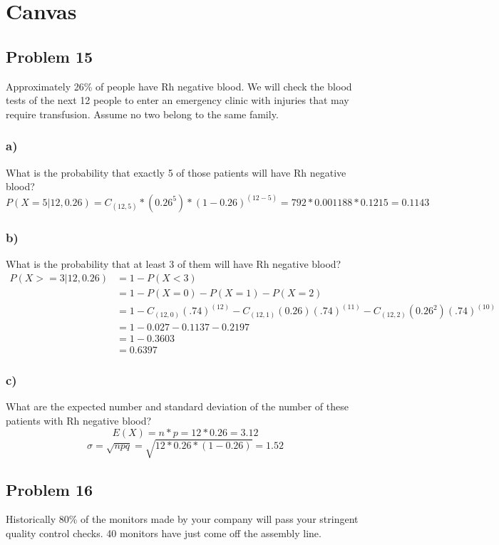 \documentclass{article}
\begin{document}
\section*{Canvas}
\subsection*{Problem 15}
Approximately 26\% of people have Rh negative blood. We will check the blood tests of the next 12 people to enter an emergency clinic with injuries that may require transfusion. Assume no two belong to the same family.
\subsubsection*{a)}
What is the probability that exactly 5 of those patients will have Rh negative blood?
\begin{equation}
    P(X=5 |12,0.26) = C_{(12,5)}*(0.26^5)*(1-0.26)^{(12-5)} = 792*0.001188*0.1215 = 0.1143
\end{equation}
\subsubsection*{b)}
What is the probability that at least 3 of them will have Rh negative blood?
\begin{align}
    P(X>=3 |12,0.26) &= 1 - P(X<3)\\
    &= 1 - P(X=0) - P(X=1) - P(X=2)\\ 
    &= 1 - C_{(12,0)}(.74)^{(12)} -                    C_{(12,1)}(0.26)(.74)^{(11)} -                    C_{(12,2)}(0.26^2)(.74)^{(10)}\\
    &= 1 - 0.027 - 0.1137 - 0.2197\\ 
    &= 1 - 0.3603\\ 
    &= 0.6397
\end{align}
\subsubsection*{c)}
What are the expected number and standard deviation of the number of these patients with Rh negative blood?
\begin{equation}
    E(X) = n*p = 12 * 0.26 = 3.12
\end{equation}
\begin{equation}
    \sigma = \sqrt{npq} = \sqrt{12*0.26*(1-0.26)} = 1.52
\end{equation}
\subsection*{Problem 16}
Historically 80\% of the monitors made by your company will pass your stringent quality control checks. 40 monitors have just come off the assembly line.
\end{document}
